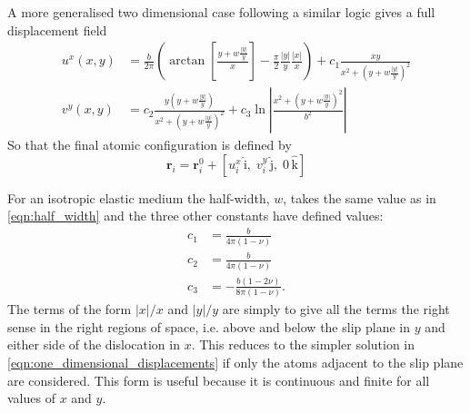 A more generalised two dimensional case following a similar logic gives a full displacement field \cite{Eshelby1949,Leibfried1949,nabarro1987theory}
\begin{subequations}\label{eqn:displacements}
\begin{align}
u^x(x,y) &= \frac{b}{2\pi} \left( \arctan \left[ \frac{y +  w\frac{|y|}{y}}{x} \right] - \frac{\pi}{2} \frac{|y|}{y} \frac{|x|}{x} \right) + c_1 \frac{xy}{x^{2} + (y + w\frac{|y|}{y} )^2} \\
v^y(x,y) &= c_2 \frac{y(y +  w \frac{|y|}{y})}{x^2 + (y +  w \frac{|y|}{y})^2} + c_3 \ln \left| \frac{x^2 + (y +  w \frac{|y|}{y})^2}{b^2} \right|
\end{align}
\end{subequations}
So that the final atomic configuration is defined by 
\begin{equation}
\bm{r}_i = \bm{r}_i^0 + [u_i^x\,\bm{\mathrm{\hat{i}}},\; v_i^y\,\bm{\mathrm{\hat{j}}},\; 0\,\bm{\mathrm{\hat{k}}}]
\end{equation}



For an isotropic elastic medium the half-width, $w$, takes the same value as in \autoref{eqn:half_width} and the three other constants have defined values:
\begin{subequations}\label{eqn:disloc_params}
\begin{align}
c_1 &= \frac{b}{4\pi{}(1-\nu)} \\
c_2 &= \frac{b}{4\pi{}(1-\nu)} \\
c_3 &= - \frac{b(1-2\nu)}{8\pi(1-\nu)}.
\end{align}
\end{subequations}
The terms of the form $|x|/x$ and $|y|/y$ are simply to give all the terms the right sense in the right regions of space, i.e. above and below the slip plane in $y$ and either side of the dislocation in $x$. This reduces to the simpler solution in \autoref{eqn:one_dimensional_displacements} if only the atoms adjacent to the slip plane are considered. This form is useful because it is continuous and finite for all values of $x$ and $y$. 



